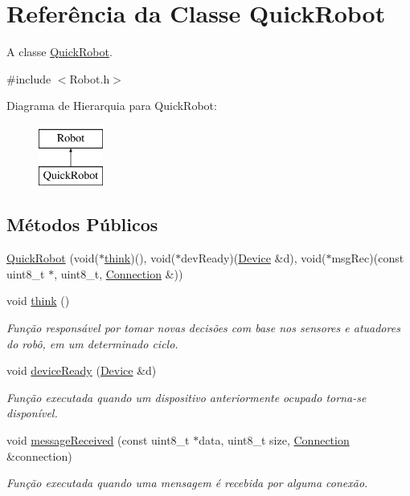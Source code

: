 \hypertarget{classQuickRobot}{\section{Referência da Classe Quick\-Robot}
\label{classQuickRobot}
}


A classe \hyperlink{classQuickRobot}{Quick\-Robot}.  




{\ttfamily \#include $<$Robot.\-h$>$}

Diagrama de Hierarquia para Quick\-Robot\-:\begin{figure}[H]
\begin{center}
\leavevmode
\includegraphics[height=2.000000cm]{classQuickRobot}
\end{center}
\end{figure}
\subsection*{Métodos Públicos}
\begin{DoxyCompactItemize}
\item 
\hyperlink{classQuickRobot_ab43c04a584a584f332119137f0b51c43}{Quick\-Robot} (void($\ast$\hyperlink{classQuickRobot_a936a04970e2fe8694256a70816b697f6}{think})(), void($\ast$dev\-Ready)(\hyperlink{classDevice}{Device} \&d), void($\ast$msg\-Rec)(const uint8\-\_\-t $\ast$, uint8\-\_\-t, \hyperlink{classConnection}{Connection} \&))
\item 
void \hyperlink{classQuickRobot_a936a04970e2fe8694256a70816b697f6}{think} ()
\begin{DoxyCompactList}\small\item\em Função responsável por tomar novas decisões com base nos sensores e atuadores do robô, em um determinado ciclo. \end{DoxyCompactList}\item 
void \hyperlink{classQuickRobot_a95d490eb2e580d362b99eb6c90927256}{device\-Ready} (\hyperlink{classDevice}{Device} \&d)
\begin{DoxyCompactList}\small\item\em Função executada quando um dispositivo anteriormente ocupado torna-\/se disponível. \end{DoxyCompactList}\item 
void \hyperlink{classQuickRobot_a96eda0e5288726364f4a02ef7912e21b}{message\-Received} (const uint8\-\_\-t $\ast$data, uint8\-\_\-t size, \hyperlink{classConnection}{Connection} \&connection)
\begin{DoxyCompactList}\small\item\em Função executada quando uma mensagem é recebida por alguma conexão. \end{DoxyCompactList}\end{DoxyCompactItemize}
